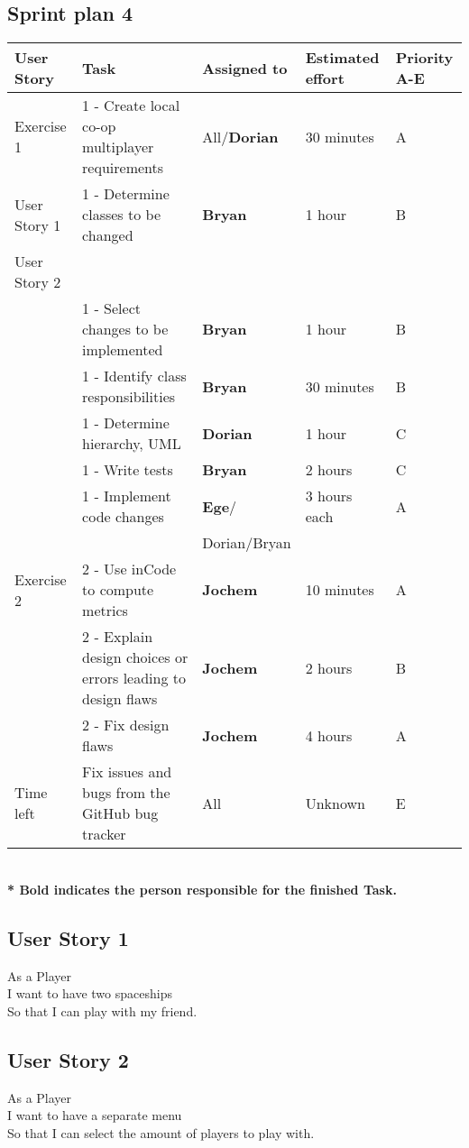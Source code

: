 \documentclass[10pt]{article}
\begin{document}
\begin{center}

\section*{Sprint plan 4}

    \hspace*{-3cm}\begin{tabular}{ | p{2cm} | p{9cm} | p{2.1cm} | p{2cm} | p{2cm} |}
    \hline
    User Story & Task & Assigned to & Estimated effort & Priority A-E \\ \hline
    Exercise 1 & 1 - Create local co-op multiplayer requirements & All/\textbf{Dorian} & 30 minutes & A\\ 
    User Story 1 & 1 - Determine classes to be changed & \textbf{Bryan} & 1 hour & B\\ 
    User Story 2 & & & &\\ 
    & 1 - Select changes to be implemented & \textbf{Bryan} & 1 hour & B\\ 
    & 1 - Identify class responsibilities & \textbf{Bryan} & 30 minutes & B\\ 
    & 1 - Determine hierarchy, UML & \textbf{Dorian} & 1 hour & C\\ 
    & 1 - Write tests & \textbf{Bryan}  & 2 hours & C\\
    & 1 - Implement code changes & \textbf{Ege}/ & 3 hours each& A\\ 
     & & Dorian/Bryan &  & \\ \hline
    Exercise 2  & 2 - Use inCode to compute metrics & \textbf{Jochem} & 10 minutes & A\\ 
    & 2 - Explain design choices or errors leading to design flaws & \textbf{Jochem} & 2 hours & B\\  
    & 2 - Fix design flaws & \textbf{Jochem} & 4 hours & A\\ \hline           
    Time left & Fix issues and bugs from the GitHub bug tracker & All & Unknown & E\\ \hline     
    \end{tabular}
   \\ 
    \textbf{* Bold indicates the person responsible for the finished Task. } 
\end{center}

\subsection*{User Story 1}
As a Player\\ 
\indent I want to have two spaceships\\
So that I can play with my friend.

\subsection*{User Story 2}
As a Player\\ 
\indent I want to have a separate menu\\
So that I can select the amount of players to play with.
\end{document}
